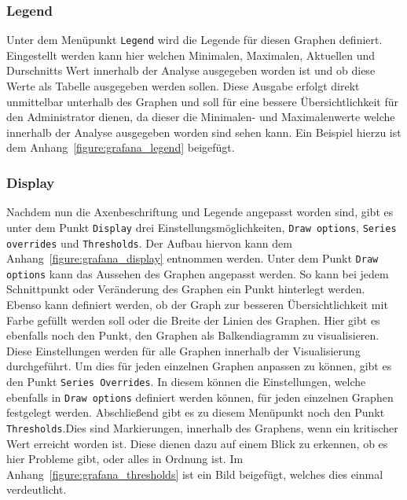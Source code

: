 \subsubsection{Legend}
Unter dem Menüpunkt \texttt{Legend} wird die Legende für diesen Graphen
definiert. Eingestellt werden kann hier welchen Minimalen, Maximalen, Aktuellen
und Durschnitts Wert innerhalb der Analyse ausgegeben worden ist und ob diese
Werte als Tabelle ausgegeben werden sollen. Diese Ausgabe erfolgt direkt
unmittelbar unterhalb des Graphen und soll für eine bessere Übersichtlichkeit
für den Administrator dienen, da dieser die Minimalen- und Maximalenwerte
welche innerhalb der Analyse ausgegeben worden sind sehen kann. Ein Beispiel
hierzu ist dem Anhang~\ref{figure:grafana_legend} beigefügt.
\mr%

\subsubsection{Display}
Nachdem nun die Axenbeschriftung und Legende angepasst worden sind, gibt es
unter dem Punkt \texttt{Display} drei Einstellungsmöglichkeiten, \texttt{Draw
options}, \texttt{Series overrides} und \texttt{Thresholds}. Der Aufbau hiervon
kann dem Anhang~\ref{figure:grafana_display} entnommen werden. Unter dem Punkt
\texttt{Draw options} kann das Aussehen des Graphen angepasst werden.  So kann
bei jedem Schnittpunkt oder Veränderung des Graphen ein Punkt hinterlegt
werden. Ebenso kann definiert werden, ob der Graph zur besseren
Übersichtlichkeit mit Farbe gefüllt werden soll oder die Breite der Linien des
Graphen. Hier gibt es ebenfalls noch den Punkt, den Graphen als Balkendiagramm
zu visualisieren. Diese Einstellungen werden für alle Graphen innerhalb der
Visualisierung durchgeführt. Um dies für jeden einzelnen Graphen anpassen zu
können, gibt es den Punkt \texttt{Series Overrides}. In diesem können die
Einstellungen, welche ebenfalls in \texttt{Draw options} definiert werden
können, für jeden einzelnen Graphen festgelegt werden. Abschließend gibt es zu
diesem Menüpunkt noch den Punkt \texttt{Thresholds}.Dies sind Markierungen,
innerhalb des Graphens, wenn ein kritischer Wert erreicht worden ist. Diese
dienen dazu auf einem Blick zu erkennen, ob es hier Probleme gibt, oder alles
in Ordnung ist. Im Anhang~\ref{figure:grafana_thresholds} ist ein Bild
beigefügt, welches dies einmal verdeutlicht.
\mr%

